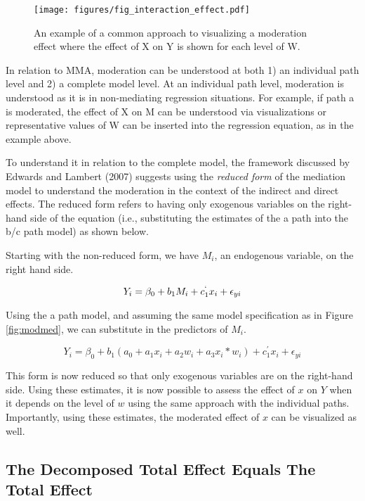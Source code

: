 \documentclass[]{DissertateUSU}
\begin{document}
\begin{figure}[tb]
\centering
\texttt{[image: figures/fig\_interaction\_effect.pdf]}
\caption{An example of a common approach to visualizing a moderation effect where the effect of X on Y is shown for each level of W.}
\label{fig:interaction}
\end{figure}

In relation to MMA, moderation can be understood at both 1) an
individual path level and 2) a complete model level. At an individual
path level, moderation is understood as it is in non-mediating
regression situations. For example, if path a is moderated, the effect
of X on M can be understood via visualizations or representative values
of W can be inserted into the regression equation, as in the example
above.

To understand it in relation to the complete model, the framework
discussed by Edwards and Lambert (2007) suggests using the \emph{reduced
form} of the mediation model to understand the moderation in the context
of the indirect and direct effects. The reduced form refers to having
only exogenous variables on the right-hand side of the equation (i.e.,
substituting the estimates of the a path into the b/c path model) as
shown below.

Starting with the non-reduced form, we have \(M_i\), an endogenous
variable, on the right hand side.

\begin{equation}
Y_i = \beta_0 + b_1 M_i + c^{`}_1 x_i + \epsilon_{yi}
\end{equation}

\noindent Using the a path model, and assuming the same model
specification as in Figure \ref{fig:modmed}, we can substitute in the
predictors of \(M_i\).

\begin{equation}
Y_i = \beta_0 + b_1 (a_0 + a_1 x_i + a_2 w_i + a_3 x_i * w_i) + c^{'}_1 x_i + \epsilon_{yi}
\end{equation}

\noindent This form is now reduced so that only exogenous variables are
on the right-hand side. Using these estimates, it is now possible to
assess the effect of \(x\) on \(Y\) when it depends on the level of
\(w\) using the same approach with the individual paths. Importantly,
using these estimates, the moderated effect of \(x\) can be visualized
as well.

\subsection{The Decomposed Total Effect Equals The Total
Effect}\label{the-decomposed-total-effect-equals-the-total-effect}
\end{document}
